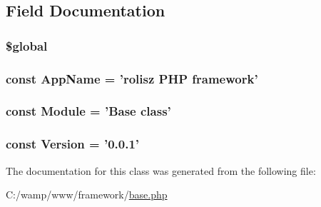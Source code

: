 \subsection{Field Documentation}
\hypertarget{classbase_aad844777d9d6beb4ca7c92d97afe7d27}{
\subsubsection[{\$global}]{\setlength{\rightskip}{0pt plus 5cm}\$global}}
\label{classbase_aad844777d9d6beb4ca7c92d97afe7d27}
\hypertarget{classbase_aab75444b144ffc4e972a9170e0a76ec0}{
\subsubsection[{AppName}]{\setlength{\rightskip}{0pt plus 5cm}const {\bf AppName} = '{\bf rolisz} PHP framework'}}
\label{classbase_aab75444b144ffc4e972a9170e0a76ec0}
\hypertarget{classbase_a2c348358c1db4bb5136855f7f31e1157}{
\subsubsection[{Module}]{\setlength{\rightskip}{0pt plus 5cm}const {\bf Module} = 'Base class'}}
\label{classbase_a2c348358c1db4bb5136855f7f31e1157}
\hypertarget{classbase_a62e44de9100d83ee01f5b4875b49a02b}{
\subsubsection[{Version}]{\setlength{\rightskip}{0pt plus 5cm}const {\bf Version} = '0.0.1'}}
\label{classbase_a62e44de9100d83ee01f5b4875b49a02b}


The documentation for this class was generated from the following file:\begin{DoxyCompactItemize}
\item 
C:/wamp/www/framework/\hyperlink{base_8php}{base.php}\end{DoxyCompactItemize}
